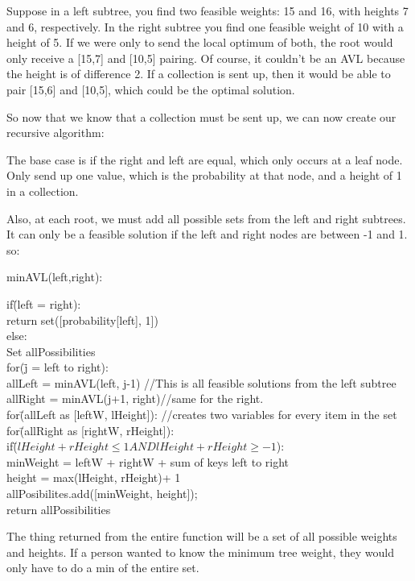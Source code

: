 \documentclass{article}
\begin{document}
\begin{enumerate}
Suppose in a left subtree, you find two feasible weights: 15 and 16, with heights 7 and 6, respectively. In the right subtree you find one feasible weight of 10 with a height of 5. If we were only to send the local optimum of both, the root would only receive a [15,7] and [10,5] pairing. Of course, it couldn't be an AVL because the height is of difference 2. If a collection is sent up, then it would be able to pair [15,6] and [10,5], which could be the optimal solution.

So now that we know that a collection must be sent up, we can now create our recursive algorithm:

The base case is if the right and left are equal, which only occurs at a leaf node. Only send up one value, which is the probability at that node, and a height of 1 in a collection.

Also, at each root, we must add all possible sets from the left and right subtrees. It can only be a feasible solution if the left and right nodes are between -1 and 1. so:
\begin{tabbing}
minAVL(left,right):

if\=(left = right):\\
	return set([probability[left], 1])\\
else:\\
\>	Set allPossibilities\\
\>	for(\=j = left to right):\\
\>\>	allLeft = minAVL(left, j-1) //This is all feasible solutions from the left subtree\\
\>\>	allRight = minAVL(j+1, right)//same for the right.\\
\>\> for\=(allLeft as [leftW, lHeight]): //creates two variables for every item in the set\\
\>\>\>	for\=(allRight as [rightW, rHeight]): \\
\>\>\>\>	if\=($lHeight + rHeight \le 1 AND lHeight + rHeight \ge -1$):\\
\>\>\>\>\>		minWeight = leftW + rightW + sum of keys left to right\\
\>\>\>\>\>		height = max(lHeight, rHeight)+ 1\\
\>\>\>\>\>		allPosibilites.add([minWeight, height]);\\
\> return allPossibilities\\
\end{tabbing}

The thing returned from the entire function will be a set of all possible weights and heights. If a person wanted to know the minimum tree weight, they would only have to do a min of the entire set.


\end{enumerate}
\end{document}
